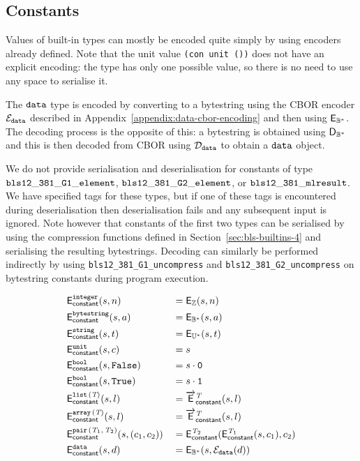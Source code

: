\subsection{Constants}
\label{sec:flat-constants}
Values of built-in types can mostly be encoded quite simply by using encoders
already defined.  Note that the unit value \texttt{(con unit ())} does not have
an explicit encoding: the type has only one possible value, so there is no need
to use any space to serialise it.

The $\mathtt{data}$ type is encoded by converting to a bytestring using the CBOR
encoder $\mathcal{E}_{\mathtt{data}}$ described in Appendix~\ref{appendix:data-cbor-encoding} and
then using $\mathsf{E}_{\mathbb{B}^*}$.  The decoding process is the opposite of this: a
bytestring is obtained using $\mathsf{D}_{\mathbb{B}^*}$ and this is then decoded from CBOR
using $\mathcal{D}_{\mathtt{data}}$ to obtain a $\mathtt{data}$ object.

We do not provide serialisation and deserialisation for constants of type
$\mathtt{bls12\_381\_G1\_element}$, $\mathtt{bls12\_381\_G2\_element}$, or
$\mathtt{bls12\_381\_mlresult}$.  We have specified tags for these types, but if one
of these tags is encountered during deserialisation then deserialisation fails
and any subsequent input is ignored.  Note however that constants of the first
two types can be serialised by using the compression functions defined in
Section~\ref{sec:bls-builtins-4} and serialising the resulting bytestrings.
Decoding can similarly be performed indirectly by using
\texttt{bls12\_381\_G1\_uncompress} and \texttt{bls12\_381\_G2\_uncompress} on
bytestring constants during program execution.

\begin{alignat*}{2}
  & \mathsf{E}_{\mathsf{constant}}^{\mathtt{integer}}(s,n)                  &&= \mathsf{E}_{\mathbb{Z}}(s, n) \\
  & \mathsf{E}_{\mathsf{constant}}^{\mathtt{bytestring}}(s,a)               &&= \mathsf{E}_{\mathbb{B}^*}(s, a) \\
  & \mathsf{E}_{\mathsf{constant}}^{\mathtt{string}}(s,t)                   &&= \mathsf{E}_{\mathbb{U}^*}(s, t) \\
  & \mathsf{E}_{\mathsf{constant}}^{\mathtt{unit}}(s,c)                     &&= s  \\
  & \mathsf{E}_{\mathsf{constant}}^{\mathtt{bool}}(s, \texttt{False})       &&= s \cdot \mathtt{0}\\
  & \mathsf{E}_{\mathsf{constant}}^{\mathtt{bool}}(s, \texttt{True})        &&= s \cdot \mathtt{1}\\
  & \mathsf{E}_{\mathsf{constant}}^{\mathtt{list}\,\mathtt{(}\textit{T}\mathtt{)}}(s,l)                  &&= \overrightarrow{\mathsf{E}}^{\textit{T}}_{\mathsf{constant}}(s, l) \\
  & \mathsf{E}_{\mathsf{constant}}^{\mathtt{array}\,\mathtt{(}\textit{T}\mathtt{)}}(s,l)                 &&= \overrightarrow{\mathsf{E}}^{\textit{T}}_{\mathsf{constant}}(s, l) \\
  & \mathsf{E}_{\mathsf{constant}}^{\mathtt{pair}\,\mathtt{(}\textit{T}_1\mathtt{,}\,\textit{T}_2\mathtt{)}}(s,(c_1,c_2)) &&= \mathsf{E}_{\mathsf{constant}}^{\textit{T}_2}(\mathsf{E}_{\mathsf{constant}}^{\textit{T}_1}(s, c_1), c_2)\\
  & \mathsf{E}_{\mathsf{constant}}^{\mathtt{data}}(s,d)                     &&= \mathsf{E}_{\mathbb{B}^*}(s, \mathcal{E}_{\mathtt{data}}(d))
\end{alignat*}

